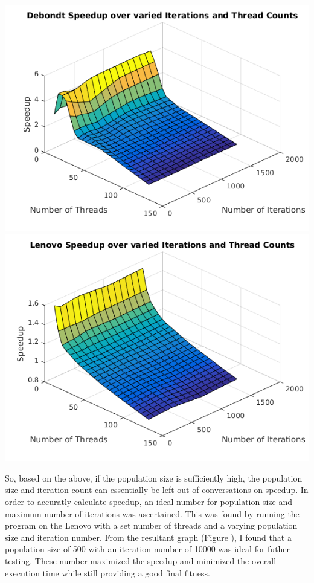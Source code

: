 \documentclass[10pt,letterpaper]{article}
\begin{document}
\includegraphics[scale=1]{../img/Debondt_IterationvsThreads.png} 
\includegraphics[scale=1]{../img/Lenovo_IterationvsThreads.png} 


So, based on the above, if the population size is sufficiently high, the population size and iteration count can essentially be left out of conversations on speedup. In order to accuratly calculate speedup, an ideal number for population size and maximum number of iterations was ascertained. This was found by running the program on the Lenovo with a set number of threads and a varying population size and iteration number. From the resultant graph (Figure %
), I found that a population size of 500 with an iteration number of 10000 was ideal for futher testing. These number maximized the speedup and minimized the overall execution time while still providing a good final fitness. 
\end{document}
